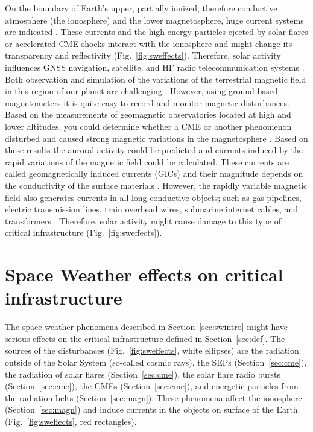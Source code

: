 \documentclass[sn-aps]{sn-jnl}%
\begin{document}
On the boundary of Earth's upper, partially ionized, therefore conductive atmosphere (the ionosphere) and the lower magnetosphere, huge current systems are indicated \cite{juusola14:_statis_gumic_mhd}. These currents and the high-energy particles ejected by solar flares or accelerated CME shocks interact with the ionosphere and might change its transparency and reflectivity (Fig.~\ref{fig:sweffects}). Therefore, solar activity influences GNSS navigation, satellite, and HF radio telecommunication systems \cite{scherer05:_space_weath}. Both observation and simulation of the variations of the terrestrial magnetic field in this region of our planet are challenging \cite{facsko16:_one_earth}. However, using ground-based magnetometers it is quite easy to record and monitor magnetic disturbances. Based on the measurements of geomagnetic observatories located at high and lower altitudes, you could determine whether a CME or another phenomenon disturbed and caused strong magnetic variations in the magnetosphere \cite{scherer05:_space_weath}. Based on these results the auroral activity could be predicted and currents induced by the rapid variations of the magnetic field could be calculated. These currents are called geomagnetically induced currents (GICs) and their magnitude depends on the conductivity of the surface materials \cite{scherer05:_space_weath}. However, the rapidly variable magnetic field also generates currents in all long conductive objects; such as gas pipelines, electric transmission lines, train overhead wires, submarine internet cables, and transformers \cite{scherer05:_space_weath}. Therefore, solar activity might cause damage to this type of critical infrastructure (Fig.~\ref{fig:sweffects}).

\section{Space Weather effects on critical infrastructure}
\label{sec:sweci}

The space weather phenomena described in Section~\ref{sec:swintro} might have serious effects on the critical infrastructure defined in Section~\ref{sec:def}. The sources of the disturbances (Fig.~\ref{fig:sweffects}, white ellipses) are the radiation outside of the Solar System (so-called cosmic rays), the SEPs (Section~\ref{sec:cme}), the radiation of solar flares (Section~\ref{sec:cme}), the solar flare radio bursts (Section~\ref{sec:cme}), the CMEs (Section~\ref{sec:cme}), and energetic particles from the radiation belts (Section~\ref{sec:magn}). These phenomena affect the ionosphere (Section~\ref{sec:magn}) and induce currents in the objects on surface of the Earth (Fig.~\ref{fig:sweffects}, red rectangles). 
\end{document}

